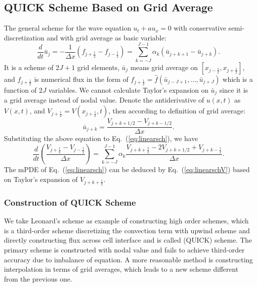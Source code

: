 \documentclass[]{article}
\def\jph{{j+\frac{1}{2}}}
\def\jmh{{j-\frac{1}{2}}}
\begin{document}
\subsection{QUICK Scheme Based on Grid Average} \label{sec:quick-scheme-based}

The general scheme for the wave equation $u_t+a u_x=0$ with
conservative semi-discretization and with grid average as basic variable:
\begin{equation}
\frac{d}{dt}\bar u_j = -\frac{1}{\Delta x}(f_{\jph}-f_{\jmh})=\sum_{k=-J}^{J-1}\alpha_k\left(\bar u_{j+k+1}-\bar u_{j+k}\right).
\label{eq:linearsch}
\end{equation}
It is a scheme of $2J+1$ grid elements, $\bar u_j$ means grid
average on $[x_{\jmh}, x_\jph]$, and $f_\jph$ is numerical flux in the
form of $f_{\jph} = \hat f(\bar u_{j-J+1},\ldots,\bar u_{j+J})$ which
is a function of $2J$ variables.
We cannot calculate Taylor's expansion on $\bar u_j$ since it is a
grid average instead of nodal value. Denote the antiderivative of
$u(x,t)$ as $V(x,t)$, and $V_\jph = V(x_\jph,t)$, then according to
definition of grid average:
\begin{equation}
\bar u_{j+k}=\frac{V_{j+k+1/2}-V_{j+k-1/2}}{\Delta x}.
\label{eq:ujkV}
\end{equation}
Substituting the above equation to Eq.~(\ref{eq:linearsch}), we have 
\begin{equation}
\frac{d}{dt}\left(\frac{V_{\jph}-V_{\jmh}}{\Delta x}\right)=\sum_{k=-J}^{J-1}\alpha_k\frac{V_{j+k+\frac{3}{2}}-2V_{j+k+1/2}+V_{j+k-\frac{1}{2}}}{\Delta x}.
\label{eq:linearschV}
\end{equation}
The mPDE of Eq.~(\ref{eq:linearsch}) can be deduced by
Eq.~(\ref{eq:linearschV}) based on Taylor's expansion of $V_{j+k+\frac 12}$.

\subsubsection{Construction of QUICK Scheme} \label{sec:construct-quick}

We take Leonard's scheme \cite{leonard1979stable}
as example of constructing high order schemes, which is a third-order scheme
discretizing the convection term with upwind scheme and directly constructing
flux across cell interface and is called (QUICK) scheme.
The primary scheme is constructed with nodal value
and fails to achieve third-order accuracy due to imbalance of equation.
A more reasonable method is constructing interpolation in terms of grid 
averages,
which leads to a new scheme different from the previous one.
\end{document}
